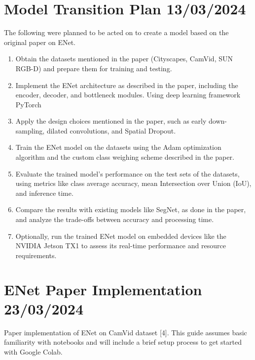 \section{Model Transition Plan 13/03/2024}
The following were planned to be acted on to create a model based on the original paper on ENet.
\begin{enumerate}
	\item Obtain the datasets mentioned in the paper (Cityscapes, CamVid, SUN RGB-D) and prepare them for training and testing.
	\item Implement the ENet architecture as described in the paper, including the encoder, decoder, and bottleneck modules. Using deep learning framework PyTorch
	\item Apply the design choices mentioned in the paper, such as early down-sampling, dilated convolutions, and Spatial Dropout.
	\item Train the ENet model on the datasets using the Adam optimization algorithm and the custom class weighing scheme described in the paper.
	\item Evaluate the trained model's performance on the test sets of the datasets, using metrics like class average accuracy, mean Intersection over Union (IoU), and inference time.
	\item Compare the results with existing models like SegNet, as done in the paper, and analyze the trade-offs between accuracy and processing time.
	\item Optionally, run the trained ENet model on embedded devices like the NVIDIA Jetson TX1 to assess its real-time performance and resource requirements.
\end{enumerate}

\section{ENet Paper Implementation 23/03/2024}
Paper implementation of ENet on CamVid dataset [4]. This guide assumes basic familiarity with notebooks and will include a brief setup process to get started with Google Colab.
